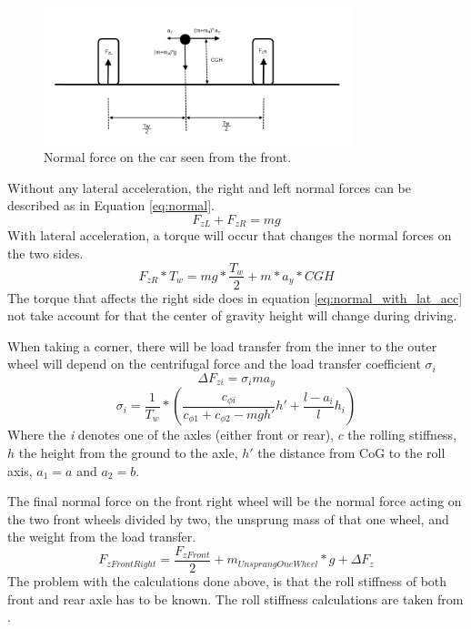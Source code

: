\begin{figure}[h]
	\centering
	\includegraphics[width=0.8\textwidth]{Pictures/normal_force_lateral}
	\caption{Normal force on the car seen from the front.}
	\label{normal_force_lateral}
\end{figure}
Without any lateral acceleration, the right and left normal forces can be described as in Equation \ref{eq:normal}. 
\begin{equation} \label{eq:normal}
	F_{zL} + F_{zR} = mg
\end{equation}
With lateral acceleration, a torque will occur that changes the normal forces on the two sides. 
\begin{equation} \label{eq:normal_with_lat_acc}
	F_{zR}*T_{w} = mg*\frac{T_{w}}{2} + m*a_{y}*CGH
\end{equation}
The torque that affects the right side does in equation \ref{eq:normal_with_lat_acc} not take account for that the center of gravity height will change during driving.

When taking a corner, there will be load transfer from the inner to the outer wheel will depend on the centrifugal force and the load transfer coefficient $ \sigma_{i} $
\begin{equation}
	\Delta F_{zi} = \sigma_{i} ma_{y}
\end{equation}
\begin{equation}
	\sigma_{i} = \frac{1}{T_{w}}*( \frac{c_{\phi i}}{c_{\phi 1}+c_{\phi 2} - mgh'}h' + \frac{l-a_{i}}{l}h_{i}) 
\end{equation}
Where the \textit{i} denotes one of the axles (either front or rear), $ c $ the rolling stiffness, $ h $ the height from the ground to the axle, $ h' $ the distance from CoG to the roll axis, $ a_{1} = a $ and $ a_{2} = b $.

The final normal force on the front right wheel will be the normal force acting on the two front wheels divided by two, the unsprung mass of that one wheel, and the weight from the load transfer.
\begin{equation}
	F_{zFrontRight} = \frac{F_{zFront}}{2} + m_{UnsprungOneWheel}*g + \Delta F_{z}
\end{equation}
The problem with the calculations done above, is that the roll stiffness of both front and rear axle has to be known. The roll stiffness calculations are taken from \cite{pacejka}.



